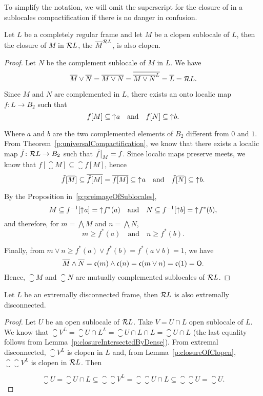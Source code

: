 To simplify the notation, we will omit the superscript for the closure of in a sublocales compactification if there is no danger in confusion.

\begin{lemma}\label{p:closureOfClopen}
    Let $L$ be a completely regular frame and let $M$ be a clopen sublocale of $L$, then the closure of $M$ in $\mathcal{R} L$, the $\overline{M}^{\mathcal{R} L}$, is also clopen.
\end{lemma}
\begin{proof}
    Let $N$ be the complement sublocale of $M$ in $L$. We have
    $$ \overline{M}\vee \overline{N} = \overline{M\vee N} = \overline{\overline{M\vee N}^L} = \overline{L} = \mathcal{R} L. $$

    Since $M$ and $N$ are complemented in $L$, there exists an onto localic map $f\colon L\to B_2$ such that
    $$ f[M] \subseteq \mathord{\uparrow}\mkern1mu a\quad\text{and}\quad f[N]\subseteq \mathord{\uparrow}\mkern1mu b. $$

    \noindent Where $a$ and $b$ are the two complemented elements of $B_2$ different from $0$ and $1$.
    From Theorem~\ref{p:universalCompactification}, we know that there exists a localic map $\tilde f\colon \mathcal{R} L\to B_2$ such that $\restr{\tilde f}{M} = f$.
    Since localic maps preserve meets, we know that $f[\closure M]\subseteq \closure{f[M]}$, hence
    $$ \tilde f[\overline{M}] \subseteq \overline{\tilde f[M]} = \overline{f[M]} \subseteq \mathord{\uparrow}\mkern1mu a\quad\text{and}\quad \tilde f[\overline{N}] \subseteq \mathord{\uparrow}\mkern1mu b. $$

    \noindent By the Proposition in~\ref{p:preimageOfSublocales},
    $$ M \subseteq f^{-1}[\mathord{\uparrow}\mkern1mu a] = \mathord{\uparrow}\mkern1mu f^*(a) \quad\text{and}\quad N \subseteq f^{-1}[\mathord{\uparrow}\mkern1mu b] = \mathord{\uparrow}\mkern1mu f^*(b), $$
    and therefore, for $m = \bigwedge M$ and $n = \bigwedge N$,
    $$ m \geq f^*(a)\quad\text{and}\quad n \geq f^*(b).$$

    \noindent Finally, from $m\vee n \geq f^*(a)\vee f^*(b) = f^*(a\vee b) = 1$, we have
    $$ \overline{M}\wedge \overline{N} = \mathfrak{c}(m)\wedge \mathfrak{c}(n) = \mathfrak{c}(m\vee n) = \mathfrak{c}(1) = \mathsf{O}. $$
    Hence, $\closure{M}$ and $\closure{N}$ are mutually complemented sublocales of $\mathcal{R} L$.
\end{proof}

\begin{proposition}\label{p:extrDiscPreserv}
    Let $L$ be an extremally disconnected frame, then $\mathcal{R} L$ is also extremally disconnected.
\end{proposition}
\begin{proof}
    Let $U$ be an open sublocale of $\mathcal{R} L$. Take $V = U\cap L$ open sublocale of $L$. We know that $\closure V^L = \closure{U\cap L}^L = \closure{U\cap L}\cap L = \closure U\cap L$ (the last equality follows from Lemma~\ref{p:closureIntersectedByDense}). From extremal disconnected, $\closure V^L$ is clopen in $L$ and, from Lemma~\ref{p:closureOfClopen}, $\closure{\closure V^L}$ is clopen in $\mathcal{R} L$. Then

    $$ \closure U = \closure{U\cap L} \subseteq \closure{\closure{V}^L} = \closure{\closure U\cap L} \subseteq \closure{\closure U} = \closure U.$$
\end{proof}

